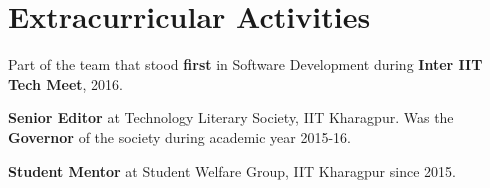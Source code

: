 \section{Extracurricular Activities}
\begin{tightitemize}
\item Part of the team that stood \textbf{first} in Software Development during \textbf{Inter IIT Tech Meet}, 2016.
\item \textbf{Senior Editor} at Technology Literary Society, IIT Kharagpur. Was the \textbf{Governor} of the society during academic year 2015-16.
\item \textbf{Student Mentor} at Student Welfare Group, IIT Kharagpur since 2015.
\end{tightitemize}

